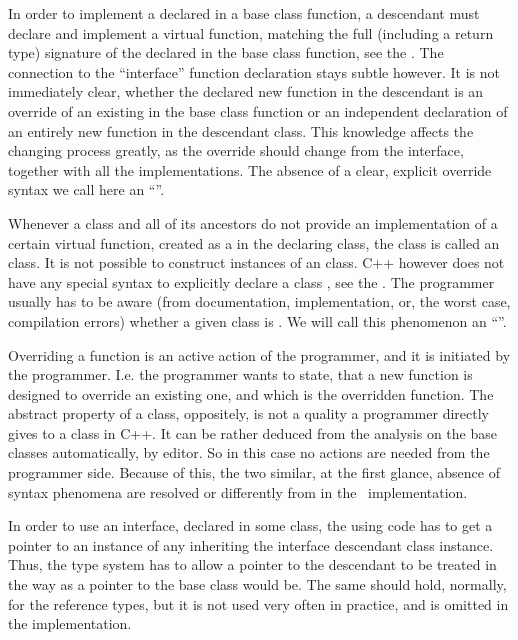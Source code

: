 In order to implement a declared in a base class function, a descendant must declare and implement
a virtual function, matching the full (including a return type) signature of the declared in the base class function, see the . 
The connection to the ``interface'' function declaration stays subtle however. It is not immediately clear, whether the 
declared new function in the descendant is an override of an existing in the base class function or an independent declaration
of an entirely new function in the descendant class. This knowledge affects the changing process greatly, as the 
override should change from the interface, together with all the implementations. The absence of a clear, 
explicit override syntax we call here an ``''.

Whenever a class and all of its ancestors do not provide an implementation of a certain virtual function,
created as a  in the declaring class, the class is called an  class. It is not possible
to construct instances of an  class. C++ however does not have any special syntax to explicitly declare a 
class ,  see the .
The programmer usually has to be aware (from documentation, implementation, or, the worst case, compilation
errors) whether a given class is . We will call this phenomenon an ``''.

Overriding a function is an active action of the programmer, and it is initiated by the 
programmer. I.e. the programmer wants to state, that a new function is designed to override an existing one, and 
which is the overridden function. The abstract property of a class, oppositely, is not a quality a programmer directly
gives to a class in C++. It can be rather deduced from the analysis on the base classes automatically, by editor. So in this case
no actions are needed from the programmer side. Because of this, the two similar, at the first glance, absence of syntax 
phenomena are resolved or differently from in the \pcpp\ implementation.

In order to use an interface, declared in some class, the using code has to get a pointer to an instance
of any inheriting the interface descendant class instance. Thus, the type system has to allow a pointer
to the descendant to be treated in the way as a pointer to the base class would be. The same should hold, 
normally, for the reference types, but it is not used very often in practice, and is omitted in the implementation.

